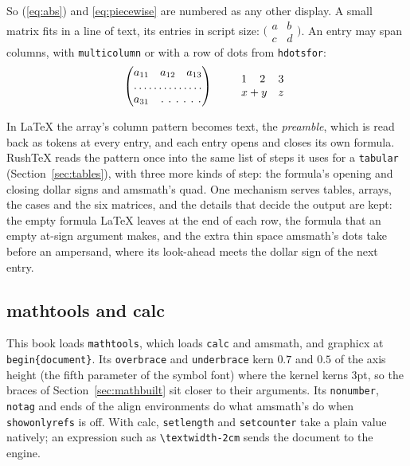 \documentclass{article}
\numberwithin{equation}{section}
\theoremstyle{definition}
\theoremstyle{remark}
\begin{document}
So (\ref{eq:abs}) and \eqref{eq:piecewise} are numbered as any other display.
A small matrix fits in a line of text, its entries in script size:
$\bigl(\begin{smallmatrix} a & b \\ c & d \end{smallmatrix}\bigr)$. An entry may span
columns, with \texttt{multicolumn} or with a row of dots from \texttt{hdotsfor}:
\[
  \begin{pmatrix} a_{11} & a_{12} & a_{13} \\ \hdotsfor{3} \\ a_{31} & \hdotsfor[2]{2} \end{pmatrix}
  \qquad
  \begin{array}{ccc} 1 & 2 & 3 \\ \multicolumn{2}{l}{x + y} & z \end{array}
\]

In \LaTeX{} the array's column pattern becomes text, the \emph{preamble}, which is read
back as tokens at every entry, and each entry opens and closes its own formula. RushTeX
reads the pattern once into the same list of steps it uses for a \texttt{tabular}
(Section~\ref{sec:tables}), with three more kinds of step: the formula's opening and
closing dollar signs and amsmath's quad. One mechanism serves tables, arrays, the cases and the
six matrices, and the details that decide the output are kept: the empty formula
\LaTeX{} leaves at the end of each row, the formula that an empty at-sign argument makes, and
the extra thin space amsmath's dots take before an ampersand, where its look-ahead meets the
dollar sign of the next entry.

\subsection{mathtools and calc}
This book loads \texttt{mathtools}, which loads \texttt{calc} and amsmath, and graphicx at
\texttt{begin\{document\}}. Its \texttt{overbrace} and \texttt{underbrace} kern
$0.7$ and $0.5$ of the axis height (the fifth parameter of the symbol font) where the
kernel kerns 3pt, so the braces of Section~\ref{sec:mathbuilt} sit closer to their arguments.
Its \texttt{nonumber}, \texttt{notag} and ends of the align environments do what amsmath's
do when \texttt{showonlyrefs} is off. With calc, \texttt{setlength} and \texttt{setcounter}
take a plain value natively; an expression such as \texttt{\textbackslash textwidth-2cm}
sends the document to the engine.
\end{document}
